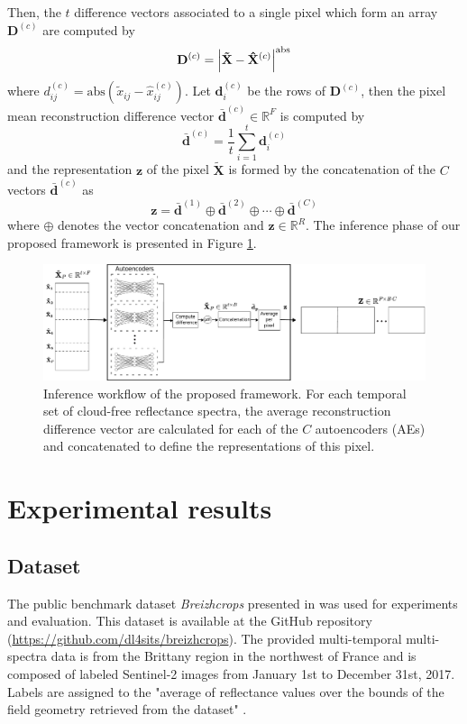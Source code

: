 \documentclass[journal,article,submit,pdftex,moreauthors]{Definitions/mdpi}
\begin{document}
Then, the $t$ difference vectors associated to a single pixel which form an array $\mathbf{D}^{(c)}$ are computed by
\begin{equation}
    \mathbf{D}^{(c)} = \abs{\mathbf{\tilde{X}} - \mathbf{\hat{X}}^{(c)}}^{\text{abs}}
\end{equation}
where $d_{ij}^{(c)} = \text{abs}(\tilde{x}_{ij} - \hat{x}^{(c)}_{ij})$. Let $\mathbf{d}_i^{(c)}$ be the rows of $\mathbf{D}^{(c)}$, then the pixel mean reconstruction difference vector $\mathbf{\bar{d}}^{(c)} \in \mathbb{R}^F$ is computed by
\begin{equation}
	\mathbf{\bar{d}}^{(c)} = \frac{1}{t}\sum_{i=1}^{t}\mathbf{d}_{i}^{(c)}
\end{equation}
and the representation $\mathbf{z}$ of the pixel $\mathbf{\tilde{X}}$ is formed by the concatenation of the $C$ vectors $\mathbf{\bar{d}}^{(c)}$ as
\begin{equation}
    \mathbf{z}=\mathbf{\bar{d}}^{(1)} \oplus \mathbf{\bar{d}}^{(2)} \oplus \cdots \oplus \mathbf{\bar{d}}^{(C)}
\end{equation}
where $\oplus$ denotes the vector concatenation and $\mathbf{z} \in \mathbb{R}^{R}$.
The inference phase of our proposed framework is presented in Figure \ref{Inference}.
\begin{figure}[H]
	\centering
	\includegraphics[width=\textwidth]{figures/testing.pdf}
	\caption{Inference workflow of the proposed framework. For each temporal set of cloud-free reflectance spectra, the average reconstruction difference vector are calculated for each of the $C$ autoencoders (AEs) and concatenated to define the representations of this pixel.}
	\label{Inference}    
\end{figure}

\section{Experimental results}
\subsection{Dataset}\label{dataset}
The public benchmark dataset \textit{Breizhcrops} presented in \cite{Russwurm2020} was used for experiments and evaluation. This dataset is available at the GitHub repository
(\url{https://github.com/dl4sits/breizhcrops}). The provided multi-temporal multi-spectra data is from the Brittany region in the northwest of France and is composed of labeled Sentinel-2 images from January 1st to December 31st, 2017. Labels are assigned to the "average of reflectance values over the bounds of the field geometry retrieved from the dataset" \cite{Russwurm2020}.
\end{document}
